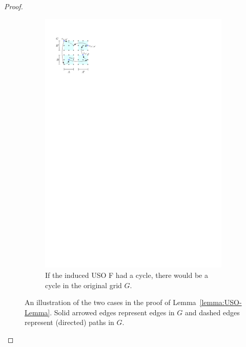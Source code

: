 \documentclass[runningheads,a4paper]{llncs}
\begin{document}
\begin{proof}
\begin{figure}
\begin{subfigure}[t]{0.47\textwidth}
\includegraphics{product_lemma_cycle.pdf}
\caption{\small If the induced USO F had a cycle, there would be a cycle in the original grid $G$.}
\label{fig:InducedUSOcycle}
\end{subfigure}
\caption{An illustration of the two cases in the proof of Lemma~\ref{lemma:USO-Lemma}. Solid arrowed edges represent edges in $G$ and dashed edges represent (directed) paths in $G$.}
\label{fig:inducesUSOboth}
\end{figure}

\end{proof}
\end{document}
